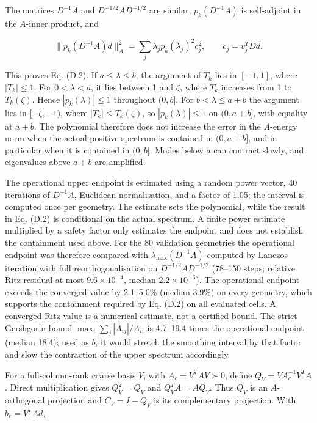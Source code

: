 \documentclass[preprint,12pt,authoryear]{elsarticle}
\begin{document}
The matrices \(D^{-1}A\) and \(D^{-1/2}AD^{-1/2}\) are similar, \(p_k(D^{-1}A)\) is self-adjoint in the \(A\)-inner product, and

\[
\|p_k(D^{-1}A)d\|_A^2
=\sum_j\lambda_j p_k(\lambda_j)^2c_j^2,
\qquad c_j=v_j^TDd.
\tag{D.4}
\]

This proves Eq. (D.2). If \(a\le\lambda\le b\), the argument of \(T_k\) lies in \([-1,1]\), where \(|T_k|\le1\). For \(0<\lambda<a\), it lies between 1 and \(\zeta\), where \(T_k\) increases from 1 to \(T_k(\zeta)\). Hence \(|p_k(\lambda)|\le1\) throughout \((0,b]\). For \(b<\lambda\le a+b\) the argument lies in \([-\zeta,-1)\), where \(|T_k|\le T_k(\zeta)\), so \(|p_k(\lambda)|\le1\) on \((0,a+b]\), with equality at \(a+b\). The polynomial therefore does not increase the error in the \(A\)-energy norm when the actual positive spectrum is contained in \((0,a+b]\), and in particular when it is contained in \((0,b]\). Modes below \(a\) can contract slowly, and eigenvalues above \(a+b\) are amplified.

The operational upper endpoint is estimated using a random power vector, 40 iterations of \(D^{-1}A\), Euclidean normalisation, and a factor of 1.05; the interval is computed once per geometry. The estimate sets the polynomial, while the result in Eq. (D.2) is conditional on the actual spectrum. A finite power estimate multiplied by a safety factor only estimates the endpoint and does not establish the containment used above. For the 80 validation geometries the operational endpoint was therefore compared with \(\lambda_{\max}(D^{-1}A)\) computed by Lanczos iteration with full reorthogonalisation on \(D^{-1/2}AD^{-1/2}\) (78--150 steps; relative Ritz residual at most \(9.6\times10^{-4}\), median \(2.2\times10^{-6}\)). The operational endpoint exceeds the converged value by 2.1--5.0\% (median 3.9\%) on every geometry, which supports the containment required by Eq. (D.2) on all evaluated cells. A converged Ritz value is a numerical estimate, not a certified bound. The strict Gershgorin bound \(\max_i\sum_j|A_{ij}|/A_{ii}\) is 4.7--19.4 times the operational endpoint (median 18.4); used as \(b\), it would stretch the smoothing interval by that factor and slow the contraction of the upper spectrum accordingly.

For a full-column-rank coarse basis \(V\), with \(A_c=V^TAV\succ0\), define \(Q_V=VA_c^{-1}V^TA\). Direct multiplication gives \(Q_V^2=Q_V\) and \(Q_V^TA=AQ_V\). Thus \(Q_V\) is an \(A\)-orthogonal projection and \(C_V=I-Q_V\) is its complementary projection. With \(b_r=V^TAd\),
\end{document}
